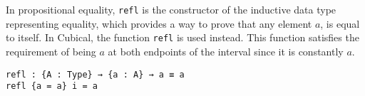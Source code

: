 In propositional equality, \texttt{refl} is the constructor of the inductive data type representing equality, which provides a way to prove that any element $a$, is equal to itself. In Cubical, the function \texttt{refl} is used instead. This function satisfies the requirement of being $a$ at both endpoints of the interval since it is constantly $a$. 

\begin{verbatim}
refl : {A : Type} → {a : A} → a ≡ a
refl {a = a} i = a
\end{verbatim}







